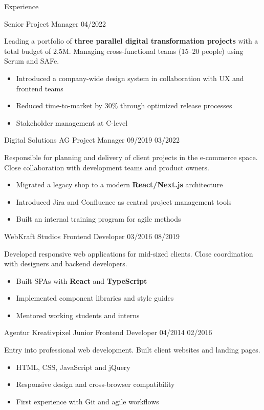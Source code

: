 \documentclass[11pt, a4paper]{article}
\begin{document}
\begin{timelinesection}{Experience}

    {Senior Project Manager}
    {04/2022}
    {}
    {Leading a portfolio of \textbf{three parallel digital transformation
    projects} with a total budget of \texteuro 2.5M. Managing cross-functional
    teams (15--20 people) using Scrum and SAFe.
    \begin{itemize}[nosep, leftmargin=1.2em, topsep=0.3em]
      \item Introduced a company-wide design system in collaboration
            with UX and frontend teams
      \item Reduced time-to-market by 30\% through optimized release processes
      \item Stakeholder management at C-level
    \end{itemize}}

  \timelineitem
    {Digital Solutions AG}
    {Project Manager}
    {09/2019}
    {03/2022}
    {Responsible for planning and delivery of client projects in the
    e-commerce space. Close collaboration with development teams and
    product owners.
    \begin{itemize}[nosep, leftmargin=1.2em, topsep=0.3em]
      \item Migrated a legacy shop to a modern \textbf{React/Next.js} architecture
      \item Introduced Jira and Confluence as central project management tools
      \item Built an internal training program for agile methods
    \end{itemize}}

  \timelineitem
    {WebKraft Studios}
    {Frontend Developer}
    {03/2016}
    {08/2019}
    {Developed responsive web applications for mid-sized clients.
    Close coordination with designers and backend developers.
    \begin{itemize}[nosep, leftmargin=1.2em, topsep=0.3em]
      \item Built SPAs with \textbf{React} and \textbf{TypeScript}
      \item Implemented component libraries and style guides
      \item Mentored working students and interns
    \end{itemize}}

  \timelineitem
    {Agentur Kreativpixel}
    {Junior Frontend Developer}
    {04/2014}
    {02/2016}
    {Entry into professional web development. Built client websites
    and landing pages.
    \begin{itemize}[nosep, leftmargin=1.2em, topsep=0.3em]
      \item HTML, CSS, JavaScript and jQuery
      \item Responsive design and cross-browser compatibility
      \item First experience with Git and agile workflows
    \end{itemize}}

\end{timelinesection}
\end{document}
